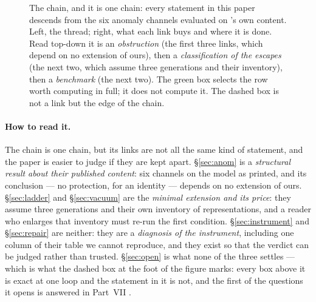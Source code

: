 \documentclass[11pt,a4paper]{article}
\newcommand{\amin}{\alpha_{\min}}
\begin{document}
\begin{figure}[p]
\caption{The chain, and it is one chain: every statement in this paper descends from the six anomaly
channels evaluated on \cite{KM25}'s own content. Left, the thread; right, what each link buys and
where it is done. Read top-down it is an \emph{obstruction} (the first three links, which depend on
no extension of ours), then a \emph{classification of the escapes} (the next two, which assume three
generations and their inventory), then a \emph{benchmark} (the next two). The green box selects the
row worth computing in full; it does not compute it. The dashed box is not a link but the edge of the
chain.}
\label{fig:chain}
\end{figure}

\paragraph{How to read it.} The chain is one chain, but its links are not all the same kind of
statement, and the paper is easier to judge if they are kept apart. \S\ref{sec:anom} is a
\emph{structural result about their published content}: six channels on the model as printed, and its
conclusion --- no protection, for an identity --- depends on no extension of ours.
\S\ref{sec:ladder} and \S\ref{sec:vacuum} are the \emph{minimal extension and its price}: they assume
three generations and their own inventory of representations, and a reader who enlarges that
inventory must re-run the first condition. \S\ref{sec:instrument} and \S\ref{sec:repair} are neither:
they are a \emph{diagnosis of the instrument}, including one column of their table we cannot
reproduce, and they exist so that the verdict can be judged rather than trusted.
\S\ref{sec:open} is what none of the three settles --- which is what the dashed box at the foot of
the figure marks: every box above it is exact at one loop and the statement in it is not, and the
first of the questions it opens is answered in Part~VII \cite{PartVII}.
\end{document}
